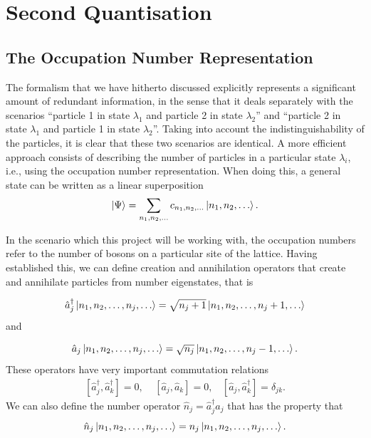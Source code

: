 \documentclass[a4paper,10pt]{article}
\begin{document}
\section{Second Quantisation}
\subsection{The Occupation Number Representation}
The formalism that we have hitherto discussed explicitly represents a significant amount of redundant information, in the sense that it deals separately with the scenarios ``particle 1 in state $\lambda_1$ and 
particle 2 in state $\lambda_2$'' and ``particle 2 in state $\lambda_1$ and particle 1 in state $\lambda_2$''. Taking into account the indistinguishability of the particles, it is clear that these two scenarios
are identical. A more efficient approach consists of describing the number of particles in a particular state $\lambda_i$, i.e., using the occupation number representation. When doing this, a general 
state can be written as a linear superposition
\begin{equation}
 \ket{\Psi}=\sum_{n_1,n_2,\dots}c_{n_1,n_2,\dots}\ket{n_1,n_2,\dots}.
\end{equation}

In the scenario which this project will be working with, the occupation numbers refer to the number of bosons on a particular site of the lattice.
Having established this, we can define creation and annihilation operators that create and annihilate particles from number eigenstates, that is

\begin{equation}
 \hat{a}_{j}^{\dagger}\ket{n_1,n_2,\dots,n_{j},\dots}=\sqrt{n_j+1}\ket{n_1,n_2,\dots,n_{j}+1,\dots}
\end{equation}
and 

\begin{equation}
 \hat{a}_{j}\ket{n_1,n_2,\dots,n_{j},\dots}=\sqrt{n_j}\ket{n_1,n_2,\dots,n_{j}-1,\dots}.
\end{equation}
These operators have very important commutation relations
\begin{equation}
\begin{align*}
 [\hat{a}_{j}^{\dagger},\hat{a}_{k}^{\dagger}]=0, \ \ \ \ \ [\hat{a}_{j},\hat{a}_{k}]=0,\ \ \ \ [\hat{a}_{j},\hat{a}_{k}^{\dagger}]=\delta_{jk}.
 \end{align*}
\end{equation}
We can also define the number operator $\hat{n}_j=\hat{a}_{j}^{\dagger}\hat{a}_j$ that has the property that
\begin{equation}
 \hat{n}_{j}\ket{n_1,n_2,\dots,n_{j},\dots}=n_{j}\ket{n_1,n_2,\dots,n_{j},\dots}.
\end{equation}
\end{document}
